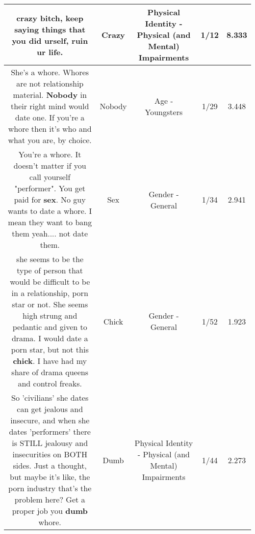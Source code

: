 \documentclass[11pt]{article}
\newlength\mylength
\begin{document}
\begin{center}
\begin{longtable}{|C{.65\mylength}|C{.30\mylength}|C{.12\mylength}|C{.12\mylength}|C{.12\mylength}|}
  \small crazy bitch, keep saying things that you did urself, ruin ur life.\normalsize   & Crazy & Physical Identity - Physical (and Mental) Impairments & 1/12 & 8.333 \\  \hline
  \small She's a whore. Whores are not relationship material. \textbf{Nobody} in their right mind would date one. If you're a whore then it's who and what you are, by choice.\normalsize   & Nobody & Age - Youngsters & 1/29 & 3.448 \\  \hline
  \small You're a whore. It doesn't matter if you call yourself "performer". You get paid for \textbf{sex}. No guy wants to date a whore. I mean they want to bang them yeah.... not date them.\normalsize   & Sex & Gender - General & 1/34 & 2.941 \\  \hline
  \small she seems to be the type of person that would be difficult to be in a relationship, porn star or not. She seems high strung and pedantic and given to drama. I would date a porn star, but not this \textbf{chick}. I have had my share of drama queens and control freaks.\normalsize   & Chick & Gender - General & 1/52 & 1.923 \\  \hline
  \small So 'civilians' she dates can get jealous and insecure, and when she dates 'performers' there is STILL jealousy and insecurities on BOTH sides. Just a thought, but maybe it's like, the porn industry that's the problem here? Get a proper job you \textbf{dumb} whore.\normalsize   & Dumb & Physical Identity - Physical (and Mental) Impairments & 1/44 & 2.273 \\  \hline

\end{longtable}
\end{center}
\end{document}
